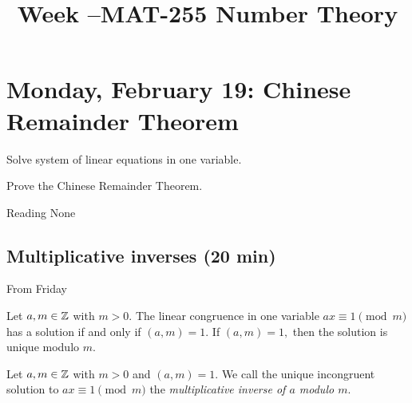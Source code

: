 \documentclass[letterpaper, 11 pt]{ximera}
\title{Week \week--MAT-255 Number Theory}
\begin{document}
\section{Monday, February 19: Chinese Remainder Theorem}

\begin{obj}
\item Solve system of linear equations in one variable.
 \item Prove the Chinese Remainder Theorem.
\end{obj}


\begin{pre}
    \item[Reading] None
\end{pre}

\subsection{Multiplicative inverses (20 min)}
From Friday

\begin{cor*}[Corollary 2.8]\label{cor:condition-invertible}
    Let $a,m\in\mathbb Z$ with $m>0.$ The linear congruence in one variable $ax\equiv 1\pmod{m}$ has a solution if and only if $(a,m)=1$. If $(a,m)=1,$ then the solution is unique modulo $m$. 
\end{cor*}

\begin{defn}\label{defn:mult-inv} Let $a,m\in\mathbb Z$ with $m>0$ and $(a,m)=1.$
    We call the unique incongruent solution to $ax\equiv 1\pmod m$ the \emph{multiplicative inverse of $a$ modulo $m$}.
\end{defn}
\end{document}
